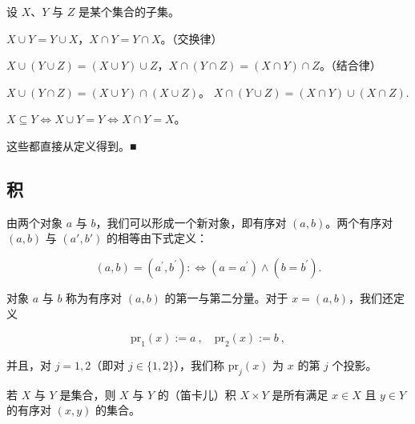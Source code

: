 \begin{proposition}

设 $X$、$Y$ 与 $Z$ 是某个集合的子集。

\begin{subitems}
\item

$ X \cup Y = Y \cup X $，$ X \cap Y = Y \cap X $。（交换律）

\item

$ X \cup (Y \cup Z) = (X \cup Y) \cup Z $，$ X \cap (Y \cap Z) = (X \cap Y) \cap Z $。（结合律）

\item

$ X \cup (Y \cap Z) = (X \cup Y) \cap (X \cup Z) $。
$ X \cap (Y \cup Z) = (X \cap Y) \cup (X \cap Z). $

\item

$ X \subseteq Y \Leftrightarrow X \cup Y = Y \Leftrightarrow X \cap Y = X $。

\proofhead
这些都直接从定义得到。■
\end{subitems}

\end{proposition}

\subsection*{积}

由两个对象 $a$ 与 $b$，我们可以形成一个新对象，即有序对 $ (a,b) $。两个有序对 $ (a,b) $ 与 $ (a',b') $ 的相等由下式定义：

\[
(a,b)=(a^{\prime},b^{\prime}):\Longleftrightarrow(a=a^{\prime})\land(b=b^{\prime}).
\]

对象 $a$ 与 $b$ 称为有序对 $ (a, b) $ 的第一与第二分量。对于 $ x = (a, b) $，我们还定义

\[
\mathrm{pr}_{1}(x):=a~,\quad\mathrm{pr}_{2}(x):=b~,
\]

并且，对 $j=1,2$（即对 $j\in\{1,2\}$），我们称 $\mathrm{pr}_{j}(x)$ 为 $x$ 的第 $j$ 个投影。

若 $X$ 与 $Y$ 是集合，则 $X$ 与 $Y$ 的（笛卡儿）积 $X \times Y$ 是所有满足 $x \in X$ 且 $y \in Y$ 的有序对 $(x, y)$ 的集合。

